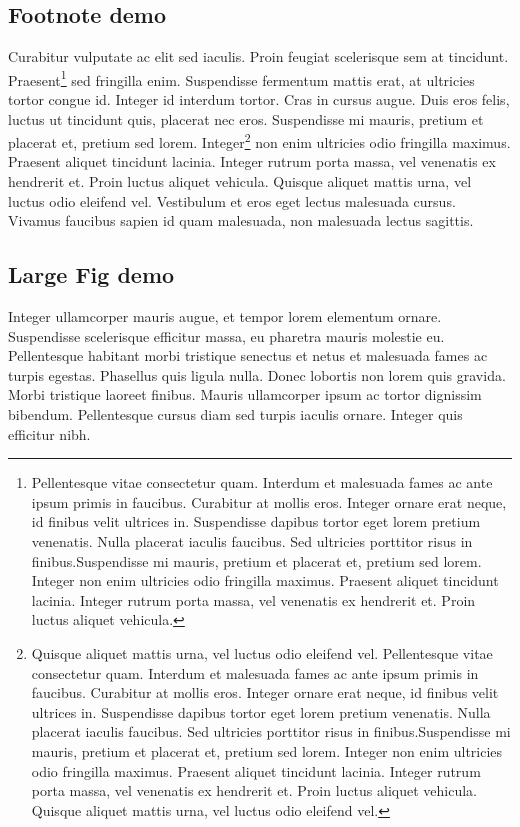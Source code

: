 \documentclass[11pt, a4paper]{report}
\begin{document}
\subsection{Footnote demo} \label{sec:intro:3}

\par Curabitur vulputate ac elit sed iaculis. Proin feugiat scelerisque sem at tincidunt. Praesent\footnote{Pellentesque vitae consectetur quam. Interdum et malesuada fames ac ante ipsum primis in faucibus. Curabitur at mollis eros. Integer ornare erat neque, id finibus velit ultrices in. Suspendisse dapibus tortor eget lorem pretium venenatis. Nulla placerat iaculis faucibus. Sed ultricies porttitor risus in finibus.Suspendisse mi mauris, pretium et placerat et, pretium sed lorem. Integer non enim ultricies odio fringilla maximus. Praesent aliquet tincidunt lacinia. Integer rutrum porta massa, vel venenatis ex hendrerit et. Proin luctus aliquet vehicula.} sed fringilla enim. Suspendisse fermentum mattis erat, at ultricies tortor congue id. Integer id interdum tortor. Cras in cursus augue. Duis eros felis, luctus ut tincidunt quis, placerat nec eros. Suspendisse mi mauris, pretium et placerat et, pretium sed lorem. Integer\footnote{Quisque aliquet mattis urna, vel luctus odio eleifend vel. Pellentesque vitae consectetur quam. Interdum et malesuada fames ac ante ipsum primis in faucibus. Curabitur at mollis eros. Integer ornare erat neque, id finibus velit ultrices in. Suspendisse dapibus tortor eget lorem pretium venenatis. Nulla placerat iaculis faucibus. Sed ultricies porttitor risus in finibus.Suspendisse mi mauris, pretium et placerat et, pretium sed lorem. Integer non enim ultricies odio fringilla maximus. Praesent aliquet tincidunt lacinia. Integer rutrum porta massa, vel venenatis ex hendrerit et. Proin luctus aliquet vehicula. Quisque aliquet mattis urna, vel luctus odio eleifend vel.} non enim ultricies odio fringilla maximus. Praesent aliquet tincidunt lacinia. Integer rutrum porta massa, vel venenatis ex hendrerit et. Proin luctus aliquet vehicula. Quisque aliquet mattis urna, vel luctus odio eleifend vel. Vestibulum et eros eget lectus malesuada cursus. Vivamus faucibus sapien id quam malesuada, non malesuada lectus sagittis. 

\subsection{Large Fig demo} \label{sec:intro:4}

\par Integer ullamcorper mauris augue, et tempor lorem elementum ornare. Suspendisse scelerisque efficitur massa, eu pharetra mauris molestie eu. Pellentesque habitant morbi tristique senectus et netus et malesuada fames ac turpis egestas. Phasellus quis ligula nulla. Donec lobortis non lorem quis gravida. Morbi tristique laoreet finibus. Mauris ullamcorper ipsum ac tortor dignissim bibendum. Pellentesque cursus diam sed turpis iaculis ornare. Integer quis efficitur nibh.
\end{document}
